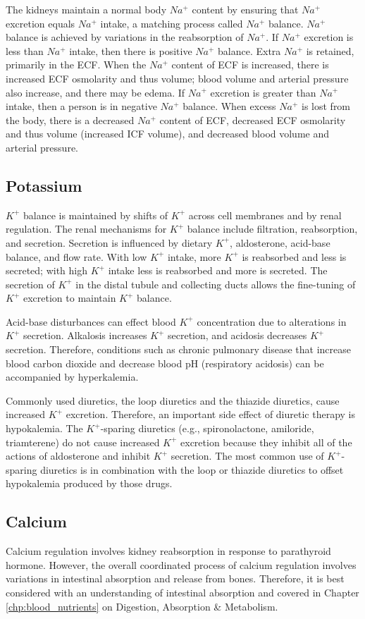 The kidneys maintain a normal body $Na^+$ content by ensuring that $Na^+$ excretion equals $Na^+$ intake, a matching process called $Na^+$ balance. $Na^+$ balance is achieved by variations in the reabsorption of $Na^+$.  If $Na^+$ excretion is less than $Na^+$ intake, then there is positive $Na^+$ balance. Extra $Na^+$ is retained, primarily in the ECF. When the $Na^+$ content of ECF is increased, there is increased ECF osmolarity and thus volume; blood volume and arterial pressure also increase, and there may be edema. If $Na^+$ excretion is greater than $Na^+$ intake, then a person is in negative $Na^+$ balance. When excess $Na^+$ is lost from the body, there is a decreased $Na^+$ content of ECF, decreased ECF osmolarity and thus volume (increased ICF volume), and decreased blood volume and arterial pressure. 


\subsection{Potassium}
$K^+$ balance is maintained by shifts of $K^+$ across cell membranes and by renal regulation. The renal mechanisms for $K^+$ balance include filtration, reabsorption, and secretion. Secretion is influenced by dietary $K^+$, aldosterone, acid-base balance, and flow rate. With low $K^+$ intake, more $K^+$ is reabsorbed and less is secreted; with high $K^+$ intake less is reabsorbed and more is secreted. The secretion of  $K^+$ in the distal tubule and collecting ducts allows the fine-tuning of $K^+$ excretion to maintain $K^+$ balance.

Acid-base disturbances can effect blood $K^+$ concentration due to alterations in $K^+$ secretion. Alkalosis increases $K^+$ secretion, and acidosis decreases $K^+$ secretion. Therefore, conditions such as chronic pulmonary disease that increase blood carbon dioxide and decrease blood pH (respiratory acidosis) can be accompanied by hyperkalemia. 

Commonly used diuretics, the loop diuretics and the thiazide diuretics, cause increased $K^+$ excretion. Therefore, an important side effect of diuretic therapy is hypokalemia. The $K^+$-sparing diuretics (e.g., spironolactone, amiloride, triamterene) do not cause increased $K^+$ excretion because they inhibit all of the actions of aldosterone and inhibit $K^+$ secretion. The most common use of $K^+$-sparing diuretics is in combination with the loop or thiazide diuretics to offset hypokalemia produced by those drugs. 

\subsection{Calcium}
Calcium regulation involves kidney reabsorption in response to parathyroid hormone. However, the overall coordinated process of calcium regulation involves variations in intestinal absorption and release from bones. Therefore, it is best considered with an understanding of intestinal absorption and covered in Chapter \ref{chp:blood_nutrients} on Digestion, Absorption \& Metabolism.

